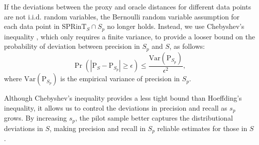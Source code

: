 

If the deviations between the proxy and oracle distances for different data points are not i.i.d. random variables, the Bernoulli random variable assumption for each data point in \(\text{SPRinT}_S\cap S_p\) no longer holds. Instead, we use Chebyshev's inequality \cite{ibe2013markov}, which only requires a finite variance, to provide a looser bound on the probability of deviation between precision in \(S_p\) and \(S\), as follows:
\begin{equation}
\Pr\left(|\text{P}_S - \text{P}_{S_p}|\geq \epsilon \right) \leq \frac{\text{Var}(\text{P}_{S_p})}{\epsilon^2},
\label{eq:Cheb}
\end{equation}
where \(\text{Var}(\text{P}_{S_p})\) is the empirical variance of precision in \(S_p\).

Although Chebyshev’s inequality provides a less tight bound than Hoeffding’s inequality, it allows us to control the deviations in precision and recall as \( s_p \) grows. By increasing \( s_p \), the pilot sample better captures the distributional deviations in \( S \), making precision and recall in \( S_p \) reliable estimates for those in \( S \). 
